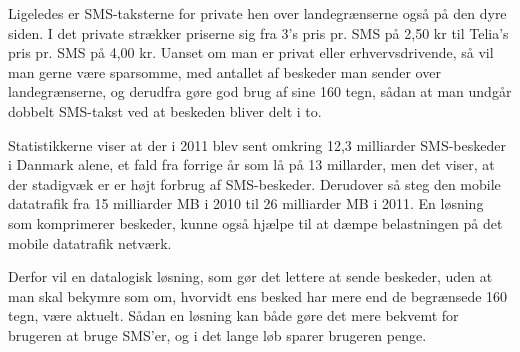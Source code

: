 Ligeledes er SMS-taksterne for private hen over landegrænserne også på den dyre siden. I det private strækker priserne sig fra 3's pris pr. SMS på 2,50 kr\cite{Pro_4} til Telia's pris pr. SMS på 4,00 kr\cite{Pro_5}. Uanset om man er privat eller erhvervsdrivende, så vil man gerne være sparsomme, med antallet af beskeder man sender over landegrænserne, og derudfra gøre god brug af sine 160 tegn, sådan at man undgår dobbelt SMS-takst ved at beskeden bliver delt i to.

Statistikkerne viser at der i 2011 blev sent omkring 12,3 milliarder SMS-beskeder i Danmark alene, et fald fra forrige år som lå på 13 millarder, men det viser, at der stadigvæk er er højt forbrug af SMS-beskeder. Derudover så steg den mobile datatrafik fra 15 milliarder MB i 2010 til 26 milliarder MB i 2011\cite{Pro_6}. En løsning som komprimerer beskeder, kunne også hjælpe til at dæmpe belastningen på det mobile datatrafik netværk.

Derfor vil en  datalogisk løsning, som gør det lettere at sende beskeder, uden at man skal bekymre som om, hvorvidt ens besked har mere end de begrænsede 160 tegn, være aktuelt. Sådan en løsning kan både gøre det mere bekvemt for brugeren at bruge SMS'er, og i det lange løb sparer brugeren penge.